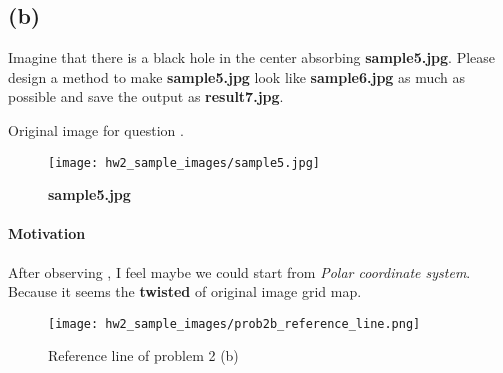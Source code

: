 \subsection{(b)}\label{2_b}
Imagine that there is a black hole in the center absorbing \textbf{sample5.jpg}. Please design a method to make \textbf{sample5.jpg} look like \textbf{sample6.jpg} as much as possible and save the output as \textbf{result7.jpg}.

Original image  for question .
\begin{figure}
    \centering
    \texttt{[image: hw2\_sample\_images/sample5.jpg]}
    \caption{\textbf{sample5.jpg}}
    \label{sample5}
\end{figure}

\paragraph{Motivation}
After observing , I feel maybe we could start from \textit{Polar coordinate system}. Because it seems the \textbf{twisted} of original image grid map.

\begin{figure}
    \centering
    \texttt{[image: hw2\_sample\_images/prob2b\_reference\_line.png]}
    \caption{Reference line of problem 2 (b)}
    \label{prob2b_reference_line}
\end{figure}

